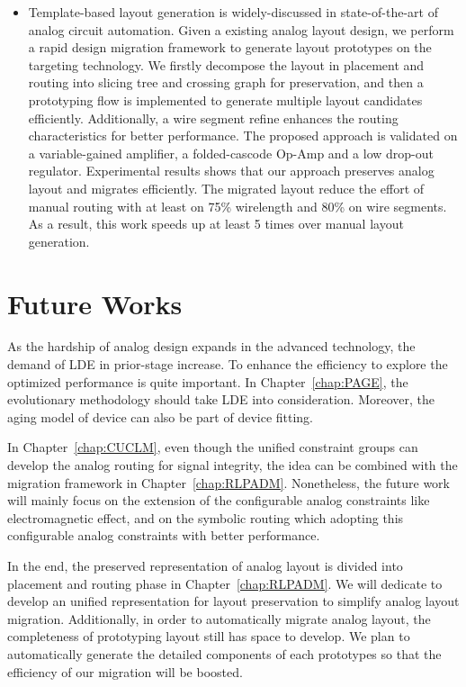 \begin{itemize}
      \item Template-based layout generation is widely-discussed in state-of-the-art of analog circuit automation. Given a existing analog layout design, we perform a rapid design migration framework to generate layout prototypes on the targeting technology. We firstly decompose the layout in placement and routing into slicing tree and crossing graph for preservation, and then a prototyping flow is implemented to generate multiple layout candidates efficiently. Additionally, a wire segment refine enhances the routing characteristics for better performance. The proposed approach is validated on a variable-gained amplifier, a folded-cascode Op-Amp and a low drop-out regulator. Experimental results shows that our approach preserves analog layout and migrates efficiently. The migrated layout reduce the effort of manual routing with at least on 75\% wirelength and 80\% on wire segments. As a result, this work speeds up at least 5 times over manual layout generation. 
    \end{itemize}

  \section{Future Works}\label{sec:FW}


    As the hardship of analog design expands in the advanced technology, the demand of LDE in prior-stage increase. To enhance the efficiency to explore the optimized performance is quite important. In Chapter~\ref{chap:PAGE}, the evolutionary methodology should take LDE into consideration. Moreover, the aging model of device can also be part of device fitting. 

    In Chapter~\ref{chap:CUCLM}, even though the unified constraint groups can develop the analog routing for signal integrity, the idea can be combined with the migration framework in Chapter~\ref{chap:RLPADM}. Nonetheless, the future work will mainly focus on the extension of the configurable analog constraints like electromagnetic effect, and on the symbolic routing which adopting this configurable analog constraints with better performance.

    In the end, the preserved representation of analog layout is divided into placement and routing phase in Chapter~\ref{chap:RLPADM}. We will dedicate to develop an unified representation for layout preservation to simplify analog layout migration. Additionally, in order to automatically migrate analog layout, the completeness of prototyping layout still has space to develop. We plan to automatically generate the detailed components of each prototypes so that the efficiency of our migration will be boosted. 